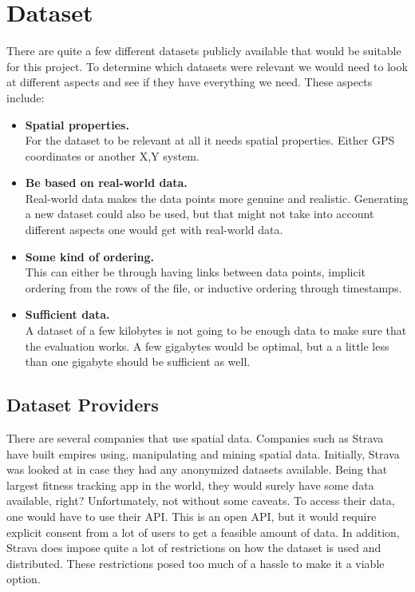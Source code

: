 \section{Dataset}
There are quite a few different datasets publicly available that would be suitable for this project. To determine which datasets were relevant we would need to look at different aspects and see if they have everything we need. These aspects include:
\begin{itemize}
	\item \textbf{Spatial properties.} \\ For the dataset to be relevant at all it needs spatial properties. Either GPS coordinates or another X,Y system.
	\item \textbf{Be based on real-world data.} \\ Real-world data makes the data points more genuine and realistic. Generating a new dataset could also be used, but that might not take into account different aspects one would get with real-world data.
	\item \textbf{Some kind of ordering.} \\ This can either be through having links between data points, implicit ordering from the rows of the file, or inductive ordering through timestamps.
	\item \textbf{Sufficient data.} \\ A dataset of a few kilobytes is not going to be enough data to make sure that the evaluation works. A few gigabytes would be optimal, but a a little less than one gigabyte should be sufficient as well.
	
\end{itemize}

\subsection{Dataset Providers}
There are several companies that use spatial data. Companies such as Strava have built empires using, manipulating and mining spatial data. Initially, Strava was looked at in case they had any anonymized datasets available. Being that largest fitness tracking app in the world, they would surely have some data available, right? Unfortunately, not without some caveats. To access their data, one would have to use their API. This is an open API, but it would require explicit consent from a lot of users to get a feasible amount of data. In addition, Strava does impose quite a lot of restrictions on how the dataset is used and distributed. These restrictions posed too much of a hassle to make it a viable option. \\

